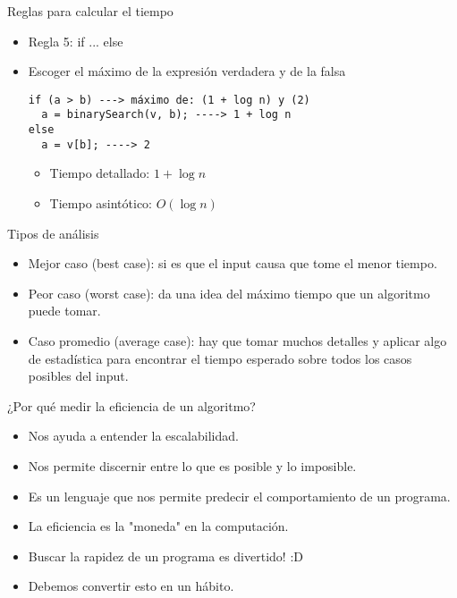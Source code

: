 \documentclass[aspectratio=169]{beamer}
\begin{document}
\begin{frame}[fragile]{Reglas para calcular el tiempo}
  \begin{itemize}
    \item Regla 5:  if ... else
    \item Escoger el máximo de la expresión verdadera y de la falsa
    \begin{lstlisting}
if (a > b) ---> máximo de: (1 + log n) y (2)
  a = binarySearch(v, b); ----> 1 + log n
else
  a = v[b]; ----> 2
    \end{lstlisting}
    \begin{itemize}
      \item Tiempo detallado: $1 + \log n$
      \item Tiempo asintótico: $O(\log n)$
    \end{itemize}
  \end{itemize}
\end{frame}

\begin{frame}{Tipos de análisis}
  \begin{itemize}
    \item Mejor caso (best case): si es que el input causa que tome el menor tiempo.
    \item Peor caso (worst case): da una idea del máximo tiempo que un algoritmo puede tomar.
    \item Caso promedio (average case): hay que tomar muchos detalles y aplicar algo de estadística para encontrar el tiempo esperado sobre todos los casos posibles del input.
  \end{itemize}
\end{frame}

\begin{frame}{¿Por qué medir la eficiencia de un algoritmo? }
  \begin{itemize}
    \item Nos ayuda a entender la escalabilidad.
    \item Nos permite discernir entre lo que es posible y lo imposible.
    \item Es un lenguaje que nos permite predecir el comportamiento de un programa.
    \item La eficiencia es la "moneda" en la computación.
    \item Buscar la rapidez de un programa es divertido! :D
    \item \alert{Debemos convertir esto en un hábito.}
  \end{itemize}
\end{frame}
\end{document}

